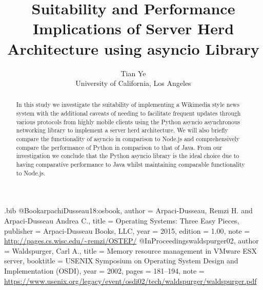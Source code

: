 \usepackage{filecontents}

\begin{filecontents}{\jobname.bib}
@Book{arpachiDusseau18:osbook,
  author =       {Arpaci-Dusseau, Remzi H. and Arpaci-Dusseau Andrea C.},
  title =        {Operating Systems: Three Easy Pieces},
  publisher =    {Arpaci-Dusseau Books, LLC},
  year =         2015,
  edition =      {1.00},
  note =         {\url{http://pages.cs.wisc.edu/~remzi/OSTEP/}}
}
@InProceedings{waldspurger02,
  author =       {Waldspurger, Carl A.},
  title =        {Memory resource management in {VMware ESX} server},
  booktitle =    {USENIX Symposium on Operating System Design and
                  Implementation (OSDI)},
  year =         2002,
  pages =        {181--194},
  note =         {\url{https://www.usenix.org/legacy/event/osdi02/tech/waldspurger/waldspurger.pdf}}}
\end{filecontents}



\date{}

\title{\Large \bf Suitability and Performance Implications of Server Herd Architecture using asyncio Library}

\author{
{\rm Tian Ye}\\
University of California, Los Angeles
} %

\maketitle

\begin{abstract}
In this study we investigate the suitability of implementing a Wikimedia style news system with the additional caveats of needing to facilitate frequent updates through various protocols from highly mobile clients using the Python asyncio asynchronous networking library to implement a server herd architecture. We will also briefly compare the functionality of asyncio in comparison to Node.js and comprehensively compare the performance of Python in comparison to that of Java. From our investigation we conclude that the Python asyncio library is the ideal choice due to having comparative performance to Java whilst maintaining comparable functionality to Node.js.
\end{abstract}



